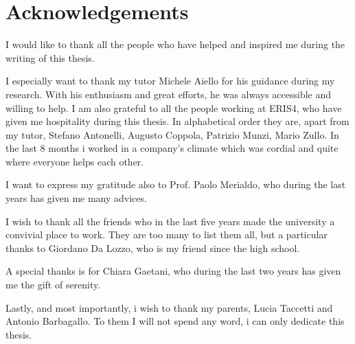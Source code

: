 \chapter{Acknowledgements}
I would like to thank all the people who have helped and inspired me during the writing of this thesis.

I especially want to thank my tutor Michele Aiello for his guidance during my research. With his enthusiasm and great efforts, he was always accessible and willing to help. I am also grateful to all the people working at ERIS4, who have given me hospitality during this thesis. In alphabetical order they are, apart from my tutor, Stefano Antonelli, Augusto Coppola, Patrizio Munzi, Mario Zullo. In the last 8 months i worked in a company's climate which was cordial and quite where everyone helps each other.

I want to express my gratitude also to Prof. Paolo Merialdo, who during the last years has given me many advices.

I wish to thank all the friends who in the last five years made the university a convivial place to work. They are too many to list them all, but a particular thanks to Giordano Da Lozzo, who is my friend since the high school.

A special thanks is for Chiara Gaetani, who during the last two years has given me the gift of serenity.

Lastly, and most importantly, i wish to thank my parents, Lucia Taccetti and Antonio Barbagallo. To them I will not spend any word, i can only dedicate this thesis.

